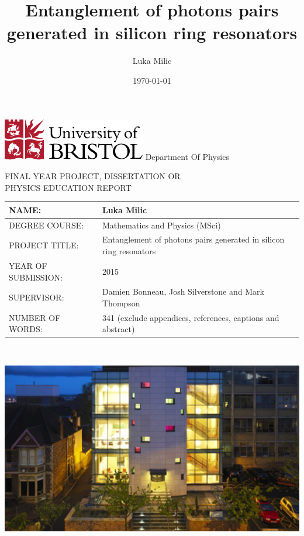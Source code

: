 \documentclass[11pt]{article}
\title{Entanglement of photons pairs generated in silicon ring resonators}
\date{\today}
\author{Luka Milic}
\begin{document}
\begin{titlepage}
  \includegraphics[scale=0.6]{img/uob-logo.png}\hfill
  \LARGE Department Of Physics \\
  \begin{center}
    FINAL YEAR PROJECT, DISSERTATION OR\\
    PHYSICS EDUCATION REPORT
  \end{center} 

  \large
  {\renewcommand{\arraystretch}{2}%
  \begin{tabular}[t]{|l|p{10cm}|}
    \hline
    NAME: & Luka Milic \\ \hline
    DEGREE COURSE: & Mathematics and Physics (MSci)\\ \hline
    PROJECT TITLE: & Entanglement of photons pairs generated in silicon ring resonators \\ \hline
    YEAR OF SUBMISSION: & 2015\\ \hline
    SUPERVISOR: & Damien Bonneau, Josh Silverstone and Mark Thompson\\ \hline
    NUMBER OF WORDS: & 341 (exclude appendices, references, captions and abstract)\\ \hline
  \end{tabular} } \quad
  \\[1.5cm]
  \begin{center}
    \includegraphics[scale=0.7]{img/nsqi.jpg}
  \end{center}
\end{titlepage}
\newpage
\maketitle
\end{document}
